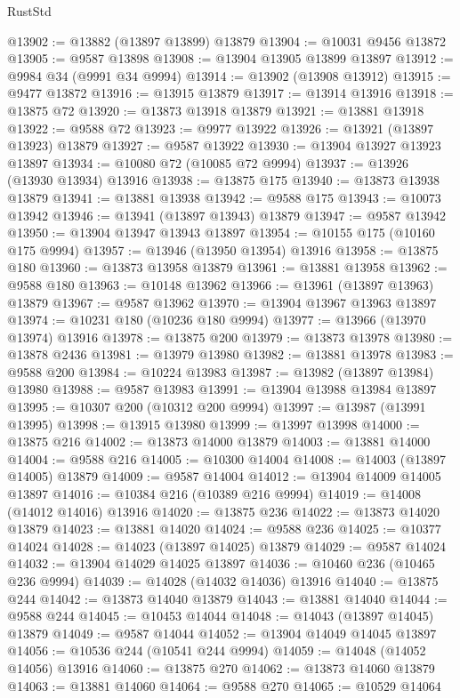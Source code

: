\begin{lexlean}{RustStd}
\begin{coremodule}
@13902 := @13882 (@13897 @13899) @13879
@13904 := @10031 @9456 @13872
@13905 := @9587 @13898
@13908 := @13904 @13905 @13899 @13897
@13912 := @9984 @34 (@9991 @34 @9994)
@13914 := @13902 (@13908 @13912)
@13915 := @9477 @13872
@13916 := @13915 @13879
@13917 := @13914 @13916
@13918 := @13875 @72
@13920 := @13873 @13918 @13879
@13921 := @13881 @13918
@13922 := @9588 @72
@13923 := @9977 @13922
@13926 := @13921 (@13897 @13923) @13879
@13927 := @9587 @13922
@13930 := @13904 @13927 @13923 @13897
@13934 := @10080 @72 (@10085 @72 @9994)
@13937 := @13926 (@13930 @13934) @13916
@13938 := @13875 @175
@13940 := @13873 @13938 @13879
@13941 := @13881 @13938
@13942 := @9588 @175
@13943 := @10073 @13942
@13946 := @13941 (@13897 @13943) @13879
@13947 := @9587 @13942
@13950 := @13904 @13947 @13943 @13897
@13954 := @10155 @175 (@10160 @175 @9994)
@13957 := @13946 (@13950 @13954) @13916
@13958 := @13875 @180
@13960 := @13873 @13958 @13879
@13961 := @13881 @13958
@13962 := @9588 @180
@13963 := @10148 @13962
@13966 := @13961 (@13897 @13963) @13879
@13967 := @9587 @13962
@13970 := @13904 @13967 @13963 @13897
@13974 := @10231 @180 (@10236 @180 @9994)
@13977 := @13966 (@13970 @13974) @13916
@13978 := @13875 @200
@13979 := @13873 @13978
@13980 := @13878 @2436
@13981 := @13979 @13980
@13982 := @13881 @13978
@13983 := @9588 @200
@13984 := @10224 @13983
@13987 := @13982 (@13897 @13984) @13980
@13988 := @9587 @13983
@13991 := @13904 @13988 @13984 @13897
@13995 := @10307 @200 (@10312 @200 @9994)
@13997 := @13987 (@13991 @13995)
@13998 := @13915 @13980
@13999 := @13997 @13998
@14000 := @13875 @216
@14002 := @13873 @14000 @13879
@14003 := @13881 @14000
@14004 := @9588 @216
@14005 := @10300 @14004
@14008 := @14003 (@13897 @14005) @13879
@14009 := @9587 @14004
@14012 := @13904 @14009 @14005 @13897
@14016 := @10384 @216 (@10389 @216 @9994)
@14019 := @14008 (@14012 @14016) @13916
@14020 := @13875 @236
@14022 := @13873 @14020 @13879
@14023 := @13881 @14020
@14024 := @9588 @236
@14025 := @10377 @14024
@14028 := @14023 (@13897 @14025) @13879
@14029 := @9587 @14024
@14032 := @13904 @14029 @14025 @13897
@14036 := @10460 @236 (@10465 @236 @9994)
@14039 := @14028 (@14032 @14036) @13916
@14040 := @13875 @244
@14042 := @13873 @14040 @13879
@14043 := @13881 @14040
@14044 := @9588 @244
@14045 := @10453 @14044
@14048 := @14043 (@13897 @14045) @13879
@14049 := @9587 @14044
@14052 := @13904 @14049 @14045 @13897
@14056 := @10536 @244 (@10541 @244 @9994)
@14059 := @14048 (@14052 @14056) @13916
@14060 := @13875 @270
@14062 := @13873 @14060 @13879
@14063 := @13881 @14060
@14064 := @9588 @270
@14065 := @10529 @14064

\end{coremodule}
\end{lexlean}
